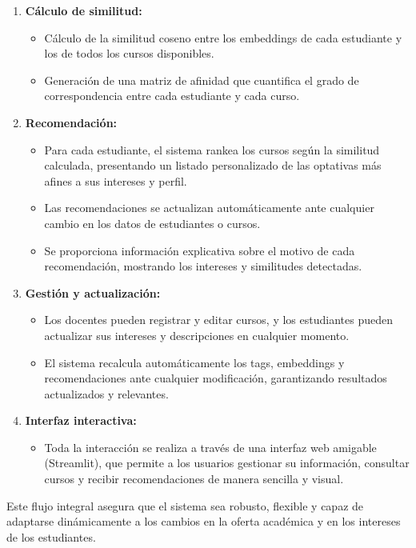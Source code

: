 \documentclass[12pt]{article}
\begin{document}
\begin{enumerate}
\begin{itemize}
    \end{itemize}
    \item \textbf{Cálculo de similitud:}
    \begin{itemize}
        \item Cálculo de la similitud coseno entre los embeddings de cada estudiante y los de todos los cursos disponibles.
        \item Generación de una matriz de afinidad que cuantifica el grado de correspondencia entre cada estudiante y cada curso.
    \end{itemize}
    \item \textbf{Recomendación:}
    \begin{itemize}
        \item Para cada estudiante, el sistema rankea los cursos según la similitud calculada, presentando un listado personalizado de las optativas más afines a sus intereses y perfil.
        \item Las recomendaciones se actualizan automáticamente ante cualquier cambio en los datos de estudiantes o cursos.
        \item Se proporciona información explicativa sobre el motivo de cada recomendación, mostrando los intereses y similitudes detectadas.
    \end{itemize}
    \item \textbf{Gestión y actualización:}
    \begin{itemize}
        \item Los docentes pueden registrar y editar cursos, y los estudiantes pueden actualizar sus intereses y descripciones en cualquier momento.
        \item El sistema recalcula automáticamente los tags, embeddings y recomendaciones ante cualquier modificación, garantizando resultados actualizados y relevantes.
    \end{itemize}
    \item \textbf{Interfaz interactiva:}
    \begin{itemize}
        \item Toda la interacción se realiza a través de una interfaz web amigable (Streamlit), que permite a los usuarios gestionar su información, consultar cursos y recibir recomendaciones de manera sencilla y visual.
    \end{itemize}
\end{enumerate}

Este flujo integral asegura que el sistema sea robusto, flexible y capaz de adaptarse dinámicamente a los cambios en la oferta académica y en los intereses de los estudiantes.
\end{document}
